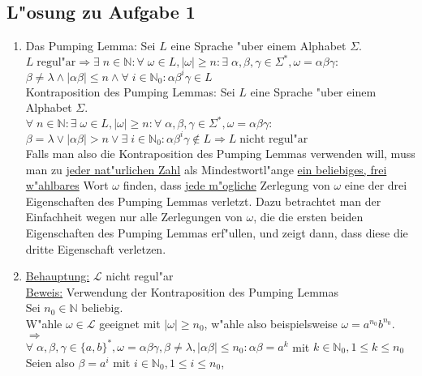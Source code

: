 \documentclass[10pt,oneside,onecolumn,a4paper,german,titlepage]{article}
\begin{document}
\subsection*{L"osung zu Aufgabe 1}
\begin{enumerate}
\item Das Pumping Lemma: Sei $L$ eine Sprache "uber einem Alphabet $\Sigma$.\\
$L \; \mbox{regul"ar} \Rightarrow \exists \; n \in \mathbb{N}:
\forall \; \omega \in L, |\omega| \geq n: \exists \; \alpha,\beta,\gamma \in
\Sigma^{*}, \omega = \alpha\beta\gamma:$\\
$\beta \not= \lambda \wedge |\alpha\beta| \leq n \wedge
\forall \; i \in \mathbb{N}_0: \alpha\beta^i\gamma \in L$\\[4pt]
Kontraposition des Pumping Lemmas: Sei $L$ eine Sprache "uber einem Alphabet
$\Sigma$.\\
$\forall \; n \in \mathbb{N}: \exists \; \omega \in L, |\omega| \geq n:
\forall \; \alpha,\beta,\gamma \in \Sigma^{*}, \omega = \alpha\beta\gamma:$\\
$\beta = \lambda \vee |\alpha\beta| > n \vee \exists \; i \in \mathbb{N}_0:
\alpha\beta^i\gamma \notin L \Rightarrow L \; \mbox{nicht regul"ar}$\\[4pt]
Falls man also die Kontraposition des Pumping Lemmas verwenden will, muss man
zu \underline{jeder nat"urlichen Zahl} als Mindestwortl"ange \underline{ein
beliebiges, frei w"ahlbares} Wort $\omega$ finden, dass \underline{jede m"ogliche}
Zerlegung von $\omega$ eine der drei Eigenschaften des Pumping Lemmas verletzt.
Dazu betrachtet man der Einfachheit wegen nur alle Zerlegungen von $\omega$, die
die ersten beiden Eigenschaften des Pumping Lemmas erf"ullen, und zeigt dann, dass
diese die dritte Eigenschaft verletzen.
\item \underline{Behauptung:} $\mathcal{L}$ nicht regul"ar\\
\underline{Beweis:} Verwendung der Kontraposition des Pumping Lemmas\\
Sei $n_0 \in \mathbb{N}$ beliebig.\\
W"ahle $\omega \in \mathcal{L}$ geeignet mit $|\omega| \geq n_0$, w"ahle also
beispielsweise $\omega = a^{n_0}b^{n_0}$. $\Rightarrow$\\
$\forall \; \alpha,\beta,\gamma \in \{a,b\}^*, \omega = \alpha\beta\gamma,
\beta \not= \lambda, |\alpha\beta| \leq n_0: \alpha\beta = a^k$ mit
$k \in \mathbb{N}_0, 1 \leq k \leq n_0$\\
Seien also $\beta = a^i$ mit $i \in \mathbb{N}_0, 1 \leq i \leq n_0$,

\end{enumerate}
\end{document}
